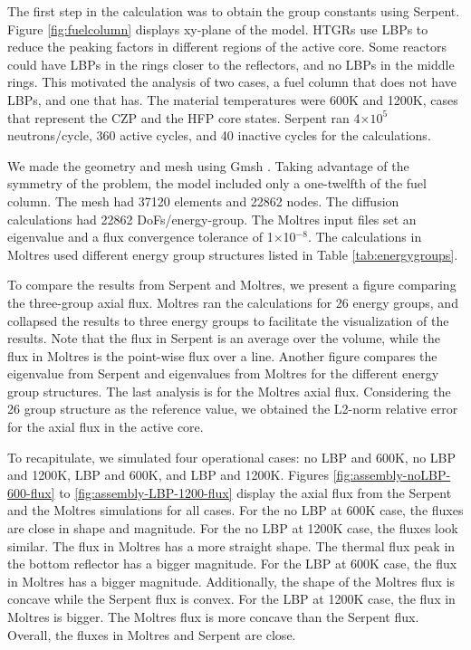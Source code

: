 \documentclass[11pt,letterpaper]{article}
\begin{document}
The first step in the calculation was to obtain the group constants using Serpent.
Figure \ref{fig:fuelcolumn} displays xy-plane of the model.
\glspl{HTGR} use \glspl{LBP} to reduce the peaking factors in different regions of the active core.
Some reactors could have \glspl{LBP} in the rings closer to the reflectors, and no \glspl{LBP} in the middle rings.
This motivated the analysis of two cases, a fuel column that does not have \glspl{LBP}, and one that has.
The material temperatures were 600K and 1200K, cases that represent the \gls{CZP} and the \gls{HFP} core states.
Serpent ran 4$\times 10^5$ neutrons/cycle, 360 active cycles, and 40 inactive cycles for the calculations.

We made the geometry and mesh using Gmsh \cite{geuzaine_gmsh_2020}.
Taking advantage of the symmetry of the problem, the model included only a one-twelfth of the fuel column.
The mesh had 37120 elements and 22862 nodes.
The diffusion calculations had 22862 \glspl{DoF}/energy-group.
The Moltres input files set an eigenvalue and a flux convergence tolerance of 1$\times$10$^{-8}$.
The calculations in Moltres used different energy group structures listed in Table \ref{tab:energygroups}.

To compare the results from Serpent and Moltres, we present a figure comparing the three-group axial flux.
Moltres ran the calculations for 26 energy groups, and collapsed the results to three energy groups to facilitate the visualization of the results.
Note that the flux in Serpent is an average over the volume, while the flux in Moltres is the point-wise flux over a line.
Another figure compares the eigenvalue from Serpent and eigenvalues from Moltres for the different energy group structures.
The last analysis is for the Moltres axial flux.
Considering the 26 group structure as the reference value, we obtained the L2-norm relative error for the axial flux in the active core.

To recapitulate, we simulated four operational cases: no \gls{LBP} and 600K, no \gls{LBP} and 1200K, \gls{LBP} and 600K, and \gls{LBP} and 1200K.
Figures \ref{fig:assembly-noLBP-600-flux} to \ref{fig:assembly-LBP-1200-flux} display the axial flux from the Serpent and the Moltres simulations for all cases.
For the no LBP at 600K case, the fluxes are close in shape and magnitude.
For the no LBP at 1200K case, the fluxes look similar.
The flux in Moltres has a more straight shape.
The thermal flux peak in the bottom reflector has a bigger magnitude.
For the LBP at 600K case, the flux in Moltres has a bigger magnitude.
Additionally, the shape of the Moltres flux is concave while the Serpent flux is convex.
For the LBP at 1200K case, the flux in Moltres is bigger.
The Moltres flux is more concave than the Serpent flux.
Overall, the fluxes in Moltres and Serpent are close.
\end{document}
